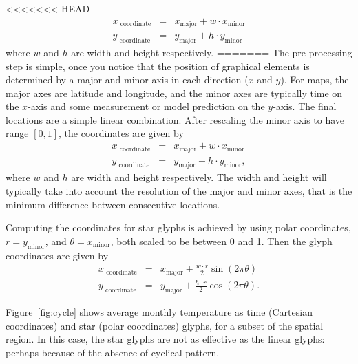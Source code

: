 \documentclass[oneside]{article}
\newcommand\amin{\text{minor}}
\newcommand\amaj{\text{major}}
\begin{document}
<<<<<<< HEAD
\begin{eqnarray*}\label{coords.eqn}
x_\text{ coordinate}&=& x_{\amaj} + w \cdot x_{\amin}\\
y_\text{ coordinate}&=& y_{\amaj} + h \cdot y_{\amin}
\end{eqnarray*}
where $w$ and $h$ are width and height respectively. =======
The pre-processing step is simple, once you notice that the position of graphical elements is determined by a major and minor axis in each direction ($x$ and $y$). For maps, the major axes are latitude and longitude, and the minor axes are typically time on the $x$-axis and some measurement or model prediction on the $y$-axis. The final locations are a simple linear combination.  After rescaling the minor axis to have range $[0, 1]$, the coordinates are given by 
\begin{equation}
\begin{array}{lll}
x_\text{ coordinate}&=& x_{\amaj} + w \cdot x_{\amin}\\
y_\text{ coordinate}&=& y_{\amaj} + h \cdot y_{\amin}, 
\end{array}\label{coords.eqn}
\end{equation}
where $w$ and $h$ are width and height respectively. The width and height will typically take into account the resolution of the major and minor axes, that is the minimum difference between consecutive locations.

Computing the coordinates for star glyphs is achieved by using polar coordinates,  $r=y_{\amin}$, and $\theta=x_{\amin}$, both scaled to be between 0 and 1. Then the glyph coordinates are given by 
\begin{equation}
\begin{array}{lll}
x_\text{ coordinate}&=& x_{\amaj} + \frac{w \cdot r}{2} \sin(2 \pi \theta) \\
y_\text{ coordinate}&=& y_{\amaj} + \frac{h \cdot r}{2} \cos(2 \pi \theta).
\end{array}\label{coords.polar.eqn}
\end{equation}

Figure~\ref{fig:cycle} shows average monthly temperature as time (Cartesian coordinates) and star (polar coordinates) glyphs, for a subset of the spatial region. In this case, the star glyphs are not as effective as the linear glyphs: perhaps because of the absence of cyclical pattern.
\end{document}
